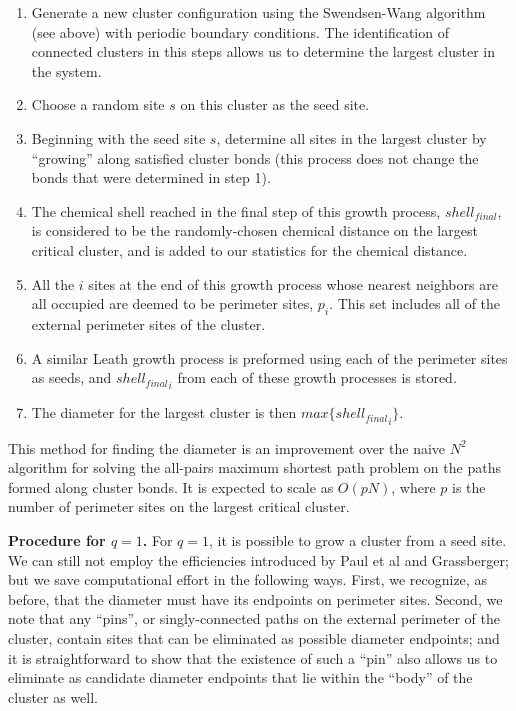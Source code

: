 \documentclass[pre,preprint,11pt]{revtex4}
\begin{document}
\begin {enumerate}
\item Generate a new cluster configuration using the Swendsen-Wang algorithm (see above) with periodic boundary conditions. The identification of connected clusters in this steps allows us to determine the largest cluster in the system.
\item Choose a random site $s$ on this cluster as the seed site.
\item Beginning with the seed site $s$, determine all sites in the largest cluster by ``growing'' along satisfied cluster bonds (this process does not change the bonds that were determined in step 1).
\item The chemical shell reached in the final step of this growth process, $shell_{final}$, is considered to be the randomly-chosen chemical distance on the largest critical cluster, and is added to our statistics for the chemical distance.  
\item All the $i$ sites at the end of this growth process whose nearest neighbors are all occupied are deemed to be perimeter sites, $p_i$.  This set includes all of the external perimeter sites of the cluster.
\item A similar Leath growth process is preformed using each of the perimeter sites as seeds, and ${shell_{final}}_i$ from each of these growth processes is stored.
\item The diameter for the largest cluster is then $max\{{shell_{final}}_i\}$.
\end {enumerate}

This method for finding the diameter is an improvement over the naive $N^2$ algorithm for solving the all-pairs maximum shortest path problem on the paths formed along cluster bonds. It is expected to scale as $O(pN)$, where $p$ is the number of perimeter sites on the largest critical cluster.


{\bf Procedure for $q=1$.} For $q=1$, it is possible to grow a cluster from a seed site.  We can still not employ the efficiencies introduced by Paul et al and Grassberger; but we save computational effort in the following ways.  First, we recognize, as before, that the diameter must have its endpoints on perimeter sites. Second, we note that any ``pins'', or singly-connected paths on the external perimeter of the cluster, contain sites that can be eliminated as possible diameter endpoints; and it is straightforward to show that the existence of such a ``pin'' also allows us to eliminate as candidate diameter endpoints that lie within the ``body'' of the cluster as well.  
\end{document}
